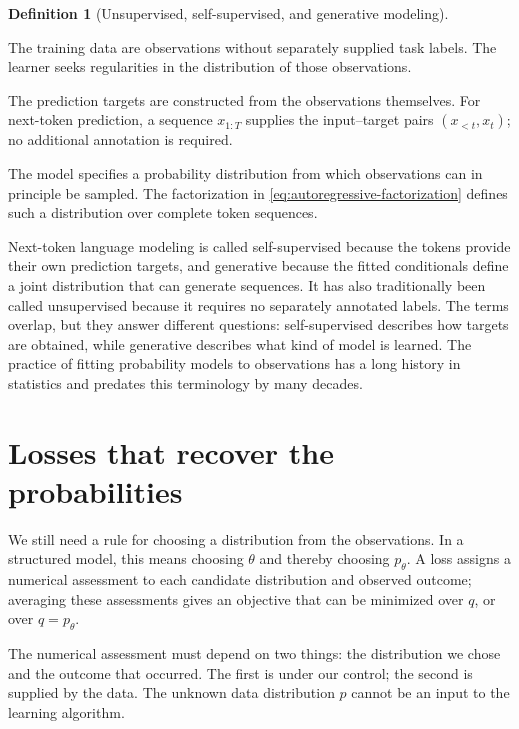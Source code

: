 \documentclass[11pt,twoside]{article}
\theoremstyle{definition}
\newtheorem{definition}[theorem]{Definition}
\theoremstyle{remark}
\begin{document}
\begin{definition}[Unsupervised, self-supervised, and generative modeling]
\label{def:learning-terms}
\begin{description}[style=nextline,leftmargin=1.7em,labelindent=0pt,
  itemsep=0.25em,topsep=0.3em]
\item[Unsupervised learning]
The training data are observations without separately supplied task labels.
The learner seeks regularities in the distribution of those observations.
\item[Self-supervised learning]
The prediction targets are constructed from the observations themselves. For
next-token prediction, a sequence $x_{1:T}$ supplies the input--target pairs
$(x_{<t},x_t)$; no additional annotation is required.
\item[Generative modeling]
The model specifies a probability distribution from which observations can in
principle be sampled. The factorization in
\cref{eq:autoregressive-factorization} defines such a distribution over
complete token sequences.
\end{description}
\end{definition}

Next-token language modeling is called self-supervised because the tokens
provide their own prediction targets, and generative because the fitted
conditionals define a joint distribution that can generate sequences. It has
also traditionally been called unsupervised because it requires no separately
annotated labels. The terms overlap, but they answer different questions:
self-supervised describes how targets are obtained, while generative describes
what kind of model is learned. The practice of fitting probability
models to observations has a long history in statistics
and predates this terminology by many decades.

\section{Losses that recover the probabilities}
\label{sec:proper-losses}

We still need a rule for choosing a distribution from the observations. In a
structured model, this means choosing $\theta$ and thereby choosing
$p_\theta$. A loss assigns a numerical assessment to each candidate
distribution and observed outcome; averaging these assessments gives an
objective that can be minimized over $q$, or over $q=p_\theta$.

The numerical assessment must depend on two things: the distribution we chose
and the outcome that occurred. The first is under our control; the second is
supplied by the data. The unknown data distribution $p$ cannot be an input to
the learning algorithm.
\end{document}

